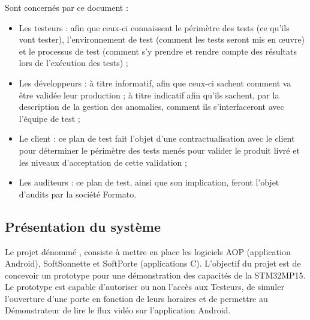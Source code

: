 Sont concernés par ce document :
\begin{itemize}
  \item Les testeurs : afin que ceux-ci connaissent le périmètre des tests (ce qu'ils vont tester), l’environnement de test (comment les tests seront mis en {\oe}uvre) et le processus de test (comment s’y prendre et rendre compte des résultats lors de l’exécution des tests) ;
  \item Les développeurs : à titre informatif, afin que ceux-ci sachent comment va être validée leur production ; à titre indicatif afin qu'ils sachent, par la description de la gestion des anomalies, comment ils s'interfaceront avec l'équipe de test ;
  \item Le client : ce plan de test fait l'objet d'une contractualisation avec le client pour déterminer le périmètre des tests menés pour valider le produit livré et les niveaux d'acceptation de cette validation ;
  \item Les auditeurs : ce plan de test, ainsi que son implication, feront l'objet d'audits par la société Formato.
\end{itemize}

%
%

\subsection{Présentation du système} 
\label{sec:intro:scope}

Le projet dénommé \projet , consiste à mettre en place les logiciels AOP (application Android), SoftSonnette et SoftPorte (applications C).
L’objectif du projet est de concevoir un prototype pour une démonstration des capacités de la STM32MP15. 
Le prototype est capable d'autoriser ou non l'accès aux Testeurs, de simuler l'ouverture d'une porte en fonction de leurs horaires et de permettre au Démonstrateur de lire le flux vidéo sur l’application Android.\\


